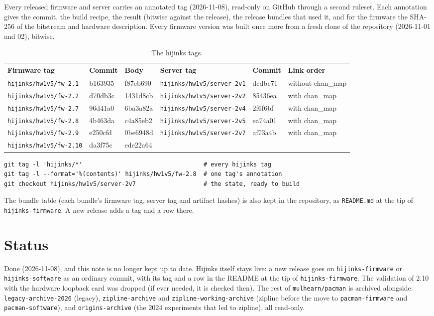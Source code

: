 \documentclass[11pt]{article}
\newcommand{\br}[1]{\texttt{#1}}
\newcommand{\h}[1]{\texttt{#1}}
\begin{document}
Every released firmware and server carries an annotated tag (2026-11-08), read-only on GitHub through a second
ruleset.  Each annotation gives the commit, the build recipe, the result (bitwise against the release), the release
bundles that used it, and for the firmware the SHA-256 of the bitstream and hardware description.  Every firmware
version was built once more from a fresh clone of the repository (2026-11-01 and 02), bitwise.

\begin{table}[h]
\centering\footnotesize
\begin{tabular}{@{}lll@{\qquad}lll@{}}
\toprule
Firmware tag & Commit & Body & Server tag & Commit & Link order \\
\midrule
\h{hijinks/hw1v5/fw-2.1} & b163935 & f87eb690 & \h{hijinks/hw1v5/server-2v1} & dcdbc71 & without chan\_map \\
\h{hijinks/hw1v5/fw-2.2} & d70db3c & 1431d8cb & \h{hijinks/hw1v5/server-2v2} & 85436ea & with chan\_map \\
\h{hijinks/hw1v5/fw-2.7} & 96d41a0 & 6ba3a82a & \h{hijinks/hw1v5/server-2v4} & 2f6f6bf & with chan\_map \\
\h{hijinks/hw1v5/fw-2.8} & 4b463da & c4a85eb2 & \h{hijinks/hw1v5/server-2v5} & ea74a01 & with chan\_map \\
\h{hijinks/hw1v5/fw-2.9} & e250cfd & 0be6948d & \h{hijinks/hw1v5/server-2v7} & af73a4b & with chan\_map \\
\h{hijinks/hw1v5/fw-2.10} & da3f75c & ede22a64 & & & \\
\bottomrule
\end{tabular}
\caption{The hijinks tags.}
\end{table}

\begin{verbatim}
git tag -l 'hijinks/*'                                  # every hijinks tag
git tag -l --format='%(contents)' hijinks/hw1v5/fw-2.8  # one tag's annotation
git checkout hijinks/hw1v5/server-2v7                   # the state, ready to build
\end{verbatim}

The bundle table (each bundle's firmware tag, server tag and artifact hashes) is also kept in the repository, as
\h{README.md} at the tip of \br{hijinks-firmware}.  A new release adds a tag and a row there.

\section{Status}

Done (2026-11-08), and this note is no longer kept up to date.  Hijinks itself stays live:  a new release goes on
\br{hijinks-firmware} or \br{hijinks-software} as an ordinary commit, with its tag and a row in the README at the tip of
\br{hijinks-firmware}.  The validation of 2.10 with the hardware loopback card was dropped (if ever needed, it is
checked then).  The rest of \h{mulhearn/pacman} is archived alongside:  \br{legacy-archive-2026} (legacy),
\br{zipline-archive} and \br{zipline-working-archive} (zipline before the move to \h{pacman-firmware} and
\h{pacman-software}), and \br{origins-archive} (the 2024 experiments that led to zipline), all read-only.
\end{document}
